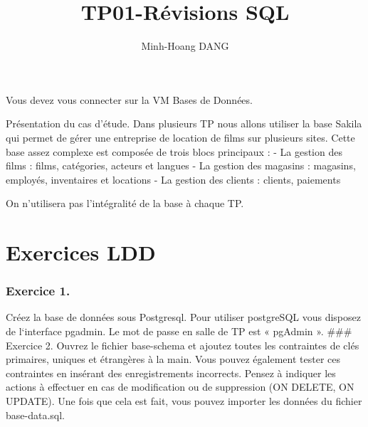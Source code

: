 \documentclass[11pt]{article}
\title{TP01-Révisions SQL}
\author{Minh-Hoang DANG}
\begin{document}
    
    
    \maketitle
    
    

    
    Vous devez vous connecter sur la VM Bases de Données.

Présentation du cas d'étude. Dans plusieurs TP nous allons utiliser la
base Sakila qui permet de gérer une entreprise de location de films sur
plusieurs sites. Cette base assez complexe est composée de trois blocs
principaux : - La gestion des films : films, catégories, acteurs et
langues - La gestion des magasins : magasins, employés, inventaires et
locations - La gestion des clients : clients, paiements

On n'utilisera pas l'intégralité de la base à chaque TP.

\hypertarget{exercices-ldd}{%
\section{Exercices LDD}\label{exercices-ldd}}

\hypertarget{exercice-1.}{%
\subsubsection{Exercice 1.}\label{exercice-1.}}

Créez la base de données sous Postgresql. Pour utiliser postgreSQL vous
disposez de l`interface pgadmin. Le mot de passe en salle de TP est «
pgAdmin ». \#\#\# Exercice 2. Ouvrez le fichier base-schema et ajoutez
toutes les contraintes de clés primaires, uniques et étrangères à la
main. Vous pouvez également tester ces contraintes en insérant des
enregistrements incorrects. Pensez à indiquer les actions à effectuer en
cas de modification ou de suppression (ON DELETE, ON UPDATE). Une fois
que cela est fait, vous pouvez importer les données du fichier
base-data.sql.
\end{document}
